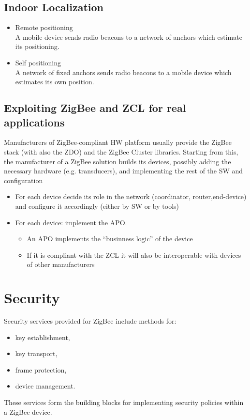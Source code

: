 \subsection{Indoor Localization}
\begin{itemize}
   \item Remote positioning\\
   A mobile device sends radio beacons to a network of anchors which estimate its positioning.
   \item Self positioning\\
   A network of fixed anchors sends radio beacons to a mobile device which estimates its own position.
   
\end{itemize}

\subsection{Exploiting ZigBee and ZCL for real applications}
Manufacturers of ZigBee-compliant HW platform usually provide
the ZigBee stack (with also the ZDO) and the ZigBee Cluster
libraries.
Starting from this, the manufacturer of a ZigBee solution builds its
devices, possibly adding the necessary hardware (e.g. transducers),
and implementing the rest of the SW and configuration
\begin{itemize}
   \item  For each device decide its role in the network (coordinator, router,end-device) and configure it accordingly (either by SW or by tools)
   \item For each device: implement the APO.
   \begin{itemize}
      \item An APO implements the ``businness logic'' of the device
      \item If it is compliant with the ZCL it will also be interoperable with devices of other manufacturers
   \end{itemize}
\end{itemize}

\section{Security}
Security services provided for ZigBee include methods for:
\begin{itemize}
   \item key establishment,
   \item key transport,
   \item frame protection,
   \item device management.
\end{itemize}
These services form the building blocks for implementing
security policies within a ZigBee device.

